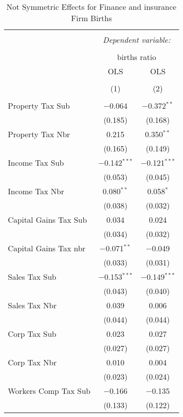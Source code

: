 
\begin{table}[!htbp] \centering 
  \caption{Not Symmetric Effects for  Finance and insurance Firm Births} 
  \label{} 
\begin{tabular}{@{\extracolsep{5pt}}lcc} 
\\[-1.8ex]\hline 
\hline \\[-1.8ex] 
 & \multicolumn{2}{c}{\textit{Dependent variable:}} \\ 
\cline{2-3} 
\\[-1.8ex] & \multicolumn{2}{c}{births ratio} \\ 
 & OLS & OLS \\ 
\\[-1.8ex] & (1) & (2)\\ 
\hline \\[-1.8ex] 
 Property Tax Sub & $-$0.064 & $-$0.372$^{**}$ \\ 
  & (0.185) & (0.168) \\ 
  Property Tax Nbr & 0.215 & 0.350$^{**}$ \\ 
  & (0.165) & (0.149) \\ 
  Income Tax Sub & $-$0.142$^{***}$ & $-$0.121$^{***}$ \\ 
  & (0.053) & (0.045) \\ 
  Income Tax Nbr & 0.080$^{**}$ & 0.058$^{*}$ \\ 
  & (0.038) & (0.032) \\ 
  Capital Gains Tax Sub & 0.034 & 0.024 \\ 
  & (0.034) & (0.032) \\ 
  Capital Gains Tax nbr & $-$0.071$^{**}$ & $-$0.049 \\ 
  & (0.033) & (0.031) \\ 
  Sales Tax Sub & $-$0.153$^{***}$ & $-$0.149$^{***}$ \\ 
  & (0.043) & (0.040) \\ 
  Sales Tax Nbr & 0.039 & 0.006 \\ 
  & (0.044) & (0.044) \\ 
  Corp Tax Sub & 0.023 & 0.027 \\ 
  & (0.027) & (0.027) \\ 
  Corp Tax Nbr & 0.010 & 0.004 \\ 
  & (0.023) & (0.024) \\ 
  Workers Comp Tax Sub & $-$0.166 & $-$0.135 \\ 
  & (0.133) & (0.122) \\ 

\end{tabular}
\end{table}
